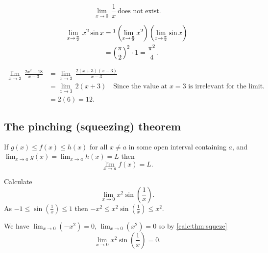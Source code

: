 \documentclass[10pt, a4paper]{article}
\begin{document}
\begin{example}
    \[
    \lim_{x \rightarrow 0}\,\frac{1}{x}\ \text{does not exist.}
    \]
\end{example}

\begin{example}
    \begin{align*}
    \lim_{x \rightarrow \frac{\pi}{2}}\,x ^ 2 \sin x &=\footnotemark \left(\lim_{x \rightarrow \frac{\pi}{2}} x^ 2 \right)\left(\lim_{x \rightarrow \frac{\pi}{2}} \sin x\right) \\
    &= \left(\frac{\pi}{2}\right) ^ 2 \cdot 1 = \frac{\pi ^ 2}{4}.
    \end{align*}
\end{example}

\begin{example}
    \begin{align*}
    \lim_{x \rightarrow 3}\,\frac{2x ^ 2 - 18}{x - 3} &= \lim_{x \rightarrow 3}\, \frac{2(x + 3)(x - 3)}{x - 3} \\
    &= \lim_{x \rightarrow 3}\,2(x + 3)\quad\text{Since the value at $x = 3$ is irrelevant for the limit.} \\
    &= 2(6) = 12.
    \end{align*}
\end{example}

\subsection{The pinching (squeezing) theorem}
\begin{theorem}\label{calc:thm:squeze}
    If $g(x) \leq f(x) \leq h(x)$ for all $x \neq a$ in some open interval containing $a$, and $\displaystyle \lim_{x \rightarrow a}g(x) = \lim_{x \rightarrow a} h(x) = L$ then
    \[
    \lim_{x \rightarrow a}f(x) = L.
    \]
\end{theorem}

\begin{example}
    Calculate
    \[
    \lim_{x \rightarrow 0} x ^ 2 \sin \left(\frac{1}{x}\right).
    \]
    As $-1 \leq \sin \left(\frac{1}{x}\right) \leq 1$ then $-x ^ 2 \leq x ^ 2 \sin \left(\frac{1}{x}\right) \leq x ^ 2$.

    We have $\lim_{x \rightarrow 0}(-x ^ 2) = 0$, $\lim_{x \rightarrow 0}(x ^ 2) = 0$ so by \autoref{calc:thm:squeze}
    \[
    \lim_{x \rightarrow 0} x ^ 2 \sin \left(\frac{1}{x}\right) = 0.
    \]
\end{example}
\end{document}
